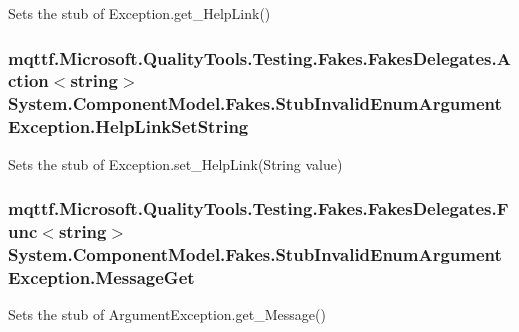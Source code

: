 Sets the stub of Exception.\-get\-\_\-\-Help\-Link()

\hypertarget{class_system_1_1_component_model_1_1_fakes_1_1_stub_invalid_enum_argument_exception_a13be59fefbaee5666d01e438489f4f6c}{
\subsubsection[{Help\-Link\-Set\-String}]{\setlength{\rightskip}{0pt plus 5cm}mqttf.\-Microsoft.\-Quality\-Tools.\-Testing.\-Fakes.\-Fakes\-Delegates.\-Action$<$string$>$ System.\-Component\-Model.\-Fakes.\-Stub\-Invalid\-Enum\-Argument\-Exception.\-Help\-Link\-Set\-String}}\label{class_system_1_1_component_model_1_1_fakes_1_1_stub_invalid_enum_argument_exception_a13be59fefbaee5666d01e438489f4f6c}


Sets the stub of Exception.\-set\-\_\-\-Help\-Link(\-String value)

\hypertarget{class_system_1_1_component_model_1_1_fakes_1_1_stub_invalid_enum_argument_exception_a8df8429cb04cd5ee87eced04e4d167c7}{
\subsubsection[{Message\-Get}]{\setlength{\rightskip}{0pt plus 5cm}mqttf.\-Microsoft.\-Quality\-Tools.\-Testing.\-Fakes.\-Fakes\-Delegates.\-Func$<$string$>$ System.\-Component\-Model.\-Fakes.\-Stub\-Invalid\-Enum\-Argument\-Exception.\-Message\-Get}}\label{class_system_1_1_component_model_1_1_fakes_1_1_stub_invalid_enum_argument_exception_a8df8429cb04cd5ee87eced04e4d167c7}


Sets the stub of Argument\-Exception.\-get\-\_\-\-Message()

